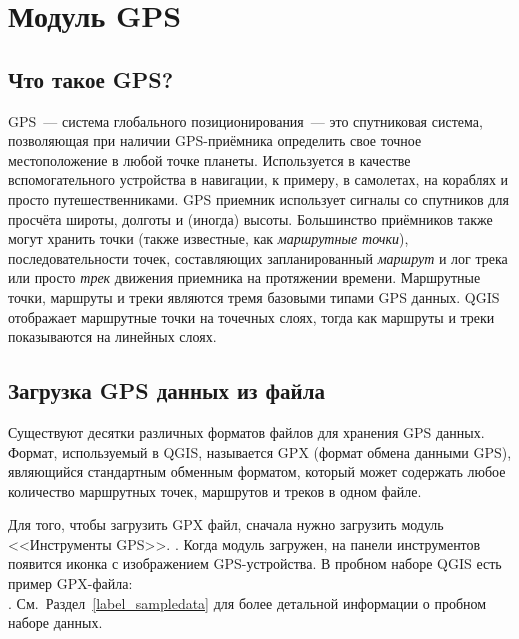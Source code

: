 
\section{Модуль GPS}\label{label_plugingps}


\subsection{Что такое GPS?}\label{whatsgps}

GPS~--- система глобального позиционирования~--- это спутниковая система,
 позволяющая при наличии GPS-приёмника определить свое точное
местоположение в любой точке планеты. Используется в качестве
вспомогательного устройства в навигации, к примеру, в самолетах, на
кораблях и просто путешественниками. GPS приемник использует сигналы со
спутников для просчёта широты, долготы и (иногда) высоты. Большинство
приёмников также могут хранить точки (также известные, как
\emph{маршрутные точки}), последовательности точек, составляющих
запланированный \emph{маршрут} и лог трека или просто \emph{трек}
движения приемника на протяжении времени. Маршрутные точки, маршруты и
треки являются тремя базовыми типами GPS данных. QGIS отображает
маршрутные точки на точечных слоях, тогда как маршруты и треки
показываются на линейных слоях.

\subsection{Загрузка GPS данных из файла}\label{label_loadgps}

Существуют десятки различных форматов файлов для хранения GPS данных.
Формат, используемый в QGIS, называется GPX (формат обмена данными GPS),
являющийся стандартным обменным форматом, который может содержать любое
количество маршрутных точек, маршрутов и треков в одном файле.

Для того, чтобы загрузить GPX файл, сначала нужно загрузить модуль <<Инструменты GPS>>.
 \arrow
{} \arrow
{}.
Когда модуль загружен, на панели инструментов появится иконка с
изображением GPS-устройства. В пробном наборе QGIS есть
пример GPX-файла: \\
.
См.~Раздел~\ref{label_sampledata} для более детальной информации
о пробном наборе данных.

